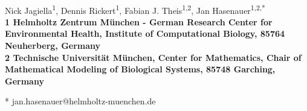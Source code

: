 \documentclass[10pt,letterpaper]{article}
\date{}
\begin{document}
\vspace*{0.35in}

\begin{flushleft}
{\Large
\textbf{}
}
\newline
\\
Nick Jagiella\textsuperscript{1},
Dennis Rickert\textsuperscript{1},
Fabian J. Theis\textsuperscript{1,2},
Jan Hasenauer\textsuperscript{1,2,*}
\\
\bigskip
\bf{1} Helmholtz Zentrum M\"unchen - German Research Center for Environmental Health, Institute of Computational Biology, 85764 Neuherberg, Germany
\\
\bf{2} Technische Universit\"at M\"unchen, Center for Mathematics, Chair of Mathematical Modeling of Biological Systems, 85748 Garching, Germany
\\
\bigskip

% 
%





* jan.hasenauer@helmholtz-muenchen.de

\end{flushleft}
\end{document}
